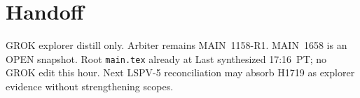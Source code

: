 \documentclass[11pt]{article}
\begin{document}
\section*{Handoff}
GROK explorer distill only. Arbiter remains MAIN~1158-R1. MAIN~1658 is an OPEN
snapshot. Root \texttt{main.tex} already at Last synthesized 17:16~PT; no GROK
edit this hour. Next LSPV-5 reconciliation may absorb H1719 as explorer evidence
without strengthening scopes.

\end{document}
